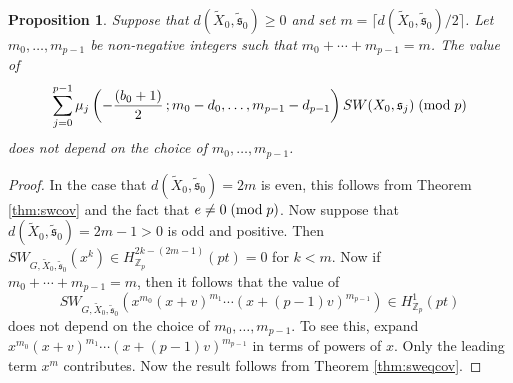 \documentclass{amsart}
\newtheorem{proposition}[theorem]{Proposition}
\theoremstyle{definition}
\theoremstyle{remark}
\numberwithin{equation}{section}
\begin{document}
\begin{proposition}\label{prop:indep}
Suppose that $d(\widetilde{X}_0 , \widetilde{\mathfrak{s}}_0) \ge 0$ and set $m = \lceil d(\widetilde{X}_0 , \widetilde{\mathfrak{s}}_0)/2 \rceil$. Let $m_0, \dots , m_{p-1}$ be non-negative integers such that $m_0 + \cdots + m_{p-1} = m$. The value of
\[
\sum_{j=0}^{p-1} \mu_j\left( -\frac{ (b_0+1) }{2} \, ; m_0-d_0 , \dots , m_{p-1} - d_{p-1} \right) SW(X_0 , \mathfrak{s}_j) \; ({\rm mod} \; p)
\]
does not depend on the choice of $m_0, \dots , m_{p-1}$.
\end{proposition}
\begin{proof}
In the case that $d(\widetilde{X}_0 , \widetilde{\mathfrak{s}}_0) = 2m$ is even, this follows from Theorem \ref{thm:swcov} and the fact that $e \neq 0 \; ({\rm mod} \; p)$. Now suppose that $d(\widetilde{X}_0 , \widetilde{\mathfrak{s}}_0) = 2m-1 > 0$ is odd and positive. Then $SW_{G , \widetilde{X}_0 , \widetilde{\mathfrak{s}}_0}( x^k ) \in H^{2k-(2m-1)}_{\mathbb{Z}_p}(pt) = 0$ for $k < m$. Now if $m_0 + \cdots + m_{p-1} = m$, then it follows that the value of
\[
SW_{G , \widetilde{X}_0 , \widetilde{\mathfrak{s}}_0}( x^{m_0} (x+v)^{m_1} \cdots (x+(p-1)v)^{m_{p-1}})  \in H^1_{\mathbb{Z}_p}(pt)
\]
does not depend on the choice of $m_0, \dots , m_{p-1}$. To see this, expand $x^{m_0} (x+v)^{m_1} \cdots (x+(p-1)v)^{m_{p-1}}$ in terms of powers of $x$. Only the leading term $x^m$ contributes. Now the result follows from Theorem \ref{thm:sweqcov}.
\end{proof}
\end{document}
